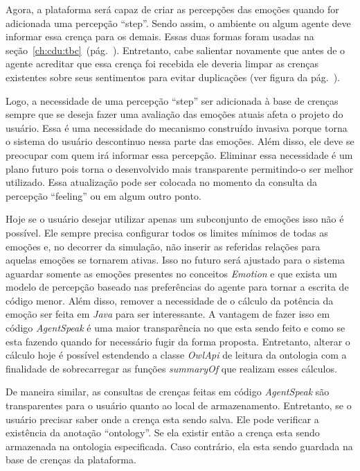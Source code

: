 Agora, a plataforma \jason será capaz de criar as percepções das emoções
quando for adicionada uma percepção ``step''. Sendo assim, o ambiente ou algum
agente deve informar essa crença para os demais.  Essas duas formas foram
usadas na seção~\ref{ch:cdu:tbc}~(pág.~\pageref{ch:cdu:tbc}). Entretanto, cabe
salientar novamente que antes de o agente acreditar que essa crença foi
recebida ele deveria limpar as crenças existentes sobre seus sentimentos para
evitar duplicações (ver figura da pág.~\pageref{fig:testeJasonIntBase}).

Logo, a necessidade de uma percepção ``step'' ser adicionada à base de crenças
sempre que se deseja fazer uma avaliação das emoções atuais afeta o projeto do
usuário. Essa é uma necessidade do mecanismo construído invasiva porque torna
o sistema do usuário descontinuo nessa parte das emoções. Além disso, ele deve
se preocupar com quem irá informar essa percepção. Eliminar essa necessidade é
um plano futuro pois torna o desenvolvido mais transparente permitindo-o ser
melhor utilizado. Essa atualização pode ser colocada no momento da consulta da
percepção ``feeling'' ou em algum outro ponto.

Hoje se o usuário desejar utilizar apenas um subconjunto de emoções isso não é
possível. Ele sempre precisa configurar todos os limites mínimos de todas as
emoções e, no decorrer da simulação, não inserir as referidas relações para
aquelas emoções se tornarem ativas. Isso no futuro será ajustado para o
sistema aguardar somente as emoções presentes no conceitos \emph{Emotion} e
que exista um modelo de percepção baseado nas preferências do agente para
tornar a escrita de código menor.
Além disso, remover a necessidade de o cálculo da potência da emoção ser feita
em \emph{Java} para ser interessante. A vantagem de fazer isso em código
\emph{AgentSpeak} é uma maior transparência no que esta sendo feito e como se
esta fazendo quando for necessário fugir da forma proposta. Entretanto,
alterar o cálculo hoje é possível estendendo a classe \emph{OwlApi} de leitura
da ontologia com a finalidade de sobrecarregar as funções \emph{summaryOf} que
realizam esses cálculos.

De maneira similar, as consultas de crenças feitas em código \emph{AgentSpeak}
são transparentes para o usuário quanto ao local de armazenamento. Entretanto,
se o usuário precisar saber onde a crença esta sendo salva. Ele pode verificar
a existência da anotação ``ontology''. Se ela existir então a crença esta
sendo armazenada na ontologia especificada. Caso contrário, ela esta sendo
guardada na base de crenças da plataforma.

